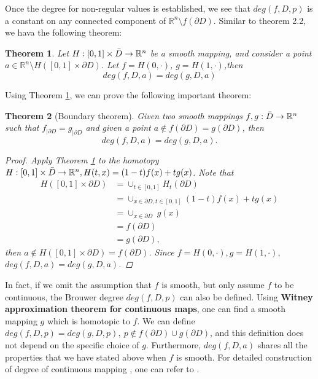\documentclass[11pt]{article}
\newtheorem{theorem}{Theorem}
\numberwithin{equation}{section} \numberwithin{theorem}{section}
\numberwithin{lemma}{section} \numberwithin{remark}{section}
\numberwithin{table}{section} \numberwithin{corollary}{section}
\numberwithin{example}{section} \numberwithin{conjecture}{section}
\numberwithin{assumption}{section}
\numberwithin{definition}{section}
\numberwithin{proposition}{section}
\begin{document}
Once the degree for non-regular values is established, we see that $deg(f,D,p)$ is a constant on any connected component of $\mathbb{R}^n\setminus f(\partial D )$.
Similar to theorem 2.2, we hava the following theorem:
\begin{theorem}\label{try1}\cite[\S 4 Prop 1.9]{outerelo2009mapping}
   Let $H:[0,1]\times \Bar{D} \rightarrow \mathbb{R}^n$ be a smooth mapping, and consider a point $a\in \mathbb{R}^n\setminus H([0,1]\times \partial D)$. Let $f=H(0,\cdotp)$, $g=H(1,\cdotp)$,then
   \begin{equation}
       deg(f,D,a)=deg(g,D,a)
   \end{equation}
\end{theorem}
Using Theorem \ref{try1}, we can prove the following important theorem:
\begin{theorem}[Boundary theorem]\cite[\S 4 prop 2.6]{outerelo2009mapping}Given two smooth mappings $f,g:\Bar{D}\rightarrow \mathbb{R}^n$ such that $f_{|\partial D}=g_{|\partial D}$ and given a point $a\notin f(\partial D)=g(\partial D)$, then
\begin{equation*}
    deg(f,D,a)=deg(g,D,a).
\end{equation*}
\begin{proof}
    Apply Theorem \ref{try1} to the homotopy  $H:[0,1]\times \Bar{D}\rightarrow \mathbb{R}^n,
    H(t,x)=(1-t)f(x)+tg(x)$. Note that 
    \begin{align*}
        H([0,1]\times \partial D)
        &=\cup_{t \in [0,1]} H_t(\partial D)\\
        &=\cup_{x\in \partial D,t \in [0,1]} (1-t)f(x)+tg(x)\\
    &= \cup_{x\in \partial D} \ g(x)\\
    &=f(\partial D)\\ &=g(\partial D),
 \end{align*}
 then $a\notin H([0,1]\times \partial D)=f(\partial D)$. Since $f=H(0,\cdotp),g=H(1,\cdotp),$ $deg(f,D,a)=deg(g,D,a)$.
\end{proof}
\end{theorem}
In fact, if we omit the assumption that $f$ is smooth, but only assume $f$ to be continuous, the Brouwer degree $deg(f,D,p)$ can also be defined\cite[\S 4.2]{outerelo2009mapping}.
Using \textbf{Witney approximation theorem for continuous maps}, one can find a smooth mapping $g$ which is homotopic to $f$. We can define $deg(f,D,p)=deg(g,D,p),\ p\notin f(\partial D)\cup g(\partial D)$, and this definition does not depend on the specific choice of $g$. Furthermore, $deg(f,D,a)$ shares all the properties that we have stated above when $f$ is smooth.
For detailed construction of degree of continuous mapping , one can refer to \cite[\S 4.2]{outerelo2009mapping}.
\end{document}
